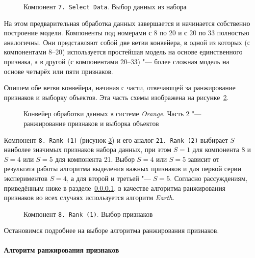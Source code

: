 \begin{figure}[tbp]
    \caption{Компонент \texttt{7.\,Select~Data}. Выбор данных из набора}
    \label{img:7-Select-Data}
\end{figure}

На этом предварительная обработка данных завершается и начинается собственно построение модели. Компоненты под номерами с 8 по 20 и с 20 по 33 полностью аналогичны. Они представляют собой две ветви конвейера, в одной из которых (с компонентами 8--20) используется простейшая модель на основе единственного признака, а в другой (с компонентами 20--33) "--- более сложная модель на основе четырёх или пяти признаков.

Опишем обе ветви конвейера, начиная с части, отвечающей за ранжирование признаков и выборку объектов. Эта часть схемы изображена на рисунке~\ref{img:series30-2}.

\begin{figure}[tbp]
    \caption{Конвейер обработки данных в системе \textit{Orange}. Часть 2 "--- ранжирование признаков и выборка объектов}
    \label{img:series30-2}
\end{figure}

Компонент \texttt{8.\,Rank~(1)} (рисунок \ref{img:8-Rank-1}) и его аналог \texttt{21.\,Rank~(2)}  выбирает $S$ наиболее значимых признаков набора данных, при этом $S = 1$ для компонента 8 и $S = 4$ или $S = 5$ для компонента 21. Выбор $S = 4$ или $S = 5$ зависит от результата работы алгоритма выделения важных признаков и для первой серии экспериментов $S = 4$, а для второй и третьей "--- $S = 5$. Согласно рассуждениям, приведённым ниже в разделе~\ref{choice-of-feature-ranking-algorithm}, в качестве алгоритма ранжирования признаков во всех случаях используется алгоритм \textit{Earth}.

\begin{figure}[tbp]
    \caption{Компонент \texttt{8.\,Rank~(1)}. Выбор признаков}
    \label{img:8-Rank-1}
\end{figure}

Остановимся подробнее на выборе алгоритма ранжирования признаков.

\paragraph{Алгоритм ранжирования признаков}
\label{choice-of-feature-ranking-algorithm}

